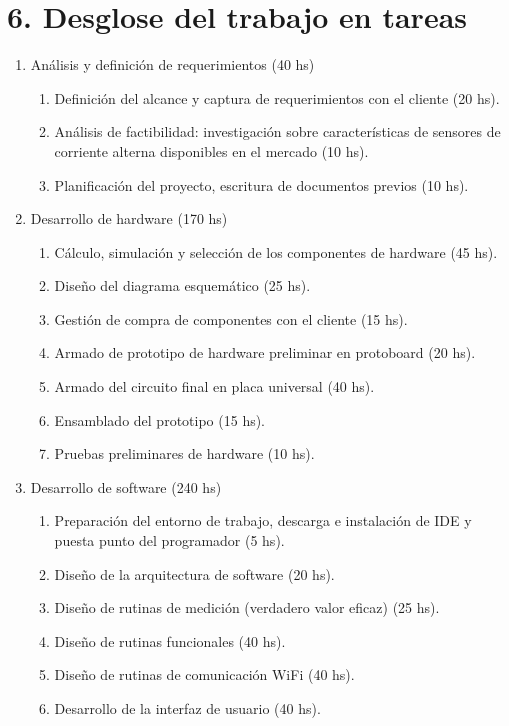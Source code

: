 \documentclass[11pt]{charter}
\begin{document}
\section{6. Desglose del trabajo en tareas}
\label{sec:wbs}


\begin{enumerate}
\item Análisis y definición de requerimientos (40 hs)
	\begin{enumerate}
	\item Definición del alcance y captura de requerimientos con el cliente (20 hs).
	\item Análisis de factibilidad: investigación sobre características de sensores de corriente alterna disponibles en el mercado (10 hs).
	\item Planificación del proyecto, escritura de documentos previos (10 hs).
	\end{enumerate}
\item Desarrollo de hardware (170 hs)
	\begin{enumerate}
	\item Cálculo, simulación y selección de los componentes de hardware (45 hs).
	\item Diseño del diagrama esquemático (25 hs).
	\item Gestión de compra de componentes con el cliente (15 hs).
	\item Armado de prototipo de hardware preliminar en protoboard (20 hs).
	\item Armado del circuito final en placa universal (40 hs).
	\item Ensamblado del prototipo (15 hs).
	\item Pruebas preliminares de hardware (10 hs).
	\end{enumerate}
\item Desarrollo de software (240 hs)
	\begin{enumerate}
	\item Preparación del entorno de trabajo, descarga e instalación de IDE y puesta punto del programador (5 hs).
	\item Diseño de la arquitectura de software (20 hs).
	\item Diseño de rutinas de medición (verdadero valor eficaz) (25 hs).
	\item Diseño de rutinas funcionales (40 hs).
	\item Diseño de rutinas de comunicación WiFi (40 hs).
	\item Desarrollo de la interfaz de usuario (40 hs).

\end{enumerate}
\end{enumerate}
\end{document}
